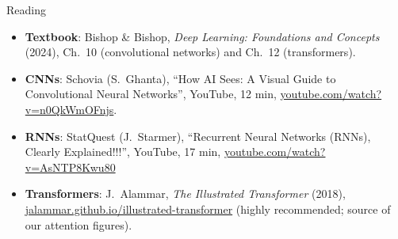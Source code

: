 \documentclass[10pt]{beamer}
\begin{document}
\begin{titledslide}{Reading}

  \small
  \begin{itemize}
  \item \textbf{Textbook}: Bishop \& Bishop, \emph{Deep Learning: Foundations
    and Concepts} (2024), Ch.\ 10 (convolutional networks) and Ch.\ 12
    (transformers). 
  \item \textbf{CNNs}: Schovia (S.\ Ghanta), ``How AI Sees: A Visual Guide to
    Convolutional Neural Networks'', YouTube, 12 min,
    \href{https://www.youtube.com/watch?v=n0QkWmOFnjs}{youtube.com/watch?v=n0QkWmOFnjs}.
  \item \textbf{RNNs}: StatQuest (J.\ Starmer), ``Recurrent Neural Networks
    (RNNs), Clearly Explained!!!'', YouTube, 17 min,
    \href{https://www.youtube.com/watch?v=AsNTP8Kwu80}{youtube.com/watch?v=AsNTP8Kwu80}
  \item \textbf{Transformers}: J.\ Alammar, \emph{The Illustrated
    Transformer} (2018),
    \href{https://jalammar.github.io/illustrated-transformer/}{jalammar.github.io/illustrated-transformer}
    (highly recommended; source of our attention figures).
  \end{itemize}

\end{titledslide}
\end{document}
